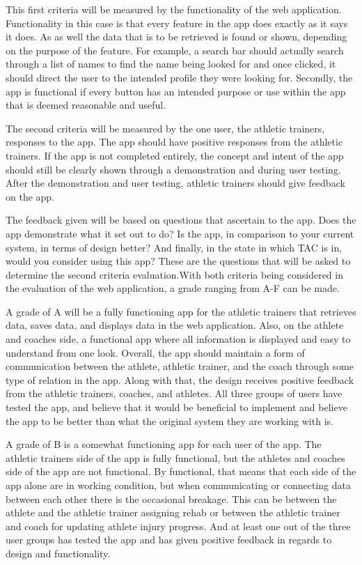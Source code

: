 \documentclass[10pt,twocolumn]{article}
\begin{document}
This first criteria will be measured by the functionality of the web application. Functionality in this case is that every feature in the app does exactly as it says it does. As as well the data that is to be retrieved is found or shown, depending on the purpose of the feature. For example, a search bar should actually search through a list of names to find the name being looked for and once clicked, it should direct the user to the intended profile they were looking for. Secondly, the app is functional if every button has an intended purpose or use within the app that is deemed reasonable and useful.

The second criteria will be measured by the one user, the athletic trainers, responses to the app. The app should have positive responses from the athletic trainers. If the app is not completed entirely, the concept and intent of the app should still be clearly shown through a demonstration and during user testing. After the demonstration and user testing, athletic trainers should give feedback on the app. 

The feedback given will be based on questions that ascertain to the app. Does the app demonstrate what it set out to do? Is the app, in comparison to your current system, in terms of design better? And finally, in the state in which TAC is in, would you consider using this app? These are the questions that will be asked to determine the second criteria evaluation.With both criteria being considered in the evaluation of the web application, a grade ranging from A-F can be made.

A grade of A will be a fully functioning app for the athletic trainers that retrieves data, saves data, and displays data in the web application. Also, on the athlete and coaches side, a functional app where all information is displayed and easy to understand from one look.
Overall, the app should maintain a form of communication between the athlete, athletic trainer, and the coach through some type of relation in the app. Along with that, the design receives positive feedback from the athletic trainers, coaches, and athletes. All three groups of users have tested the app, and believe that it would be beneficial to implement and believe the app to be better than what the original system they are working with is.

A grade of B is a somewhat functioning app for each user of the app. The athletic trainers side of the app is fully functional, but the athletes and coaches side of the app are not functional. By functional, that means that each side of the app alone are in working condition, but when communicating or connecting data between each other there is the occasional breakage. This can be between the athlete and the athletic trainer assigning rehab or between the athletic trainer and coach for updating athlete injury progress. And at least one out of the three user groups has tested the app and has given positive feedback in regards to design and functionality.
\end{document}
